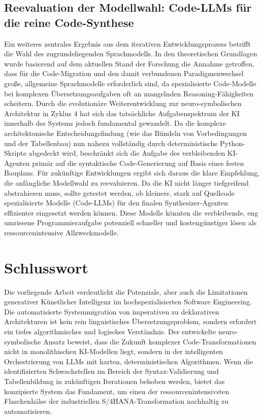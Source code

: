 \subsection{Reevaluation der Modellwahl: Code-LLMs für die reine Code-Synthese}
Ein weiteres zentrales Ergebnis aus dem iterativen Entwicklungsprozess betrifft die Wahl des zugrundeliegenden Sprachmodells. In den theoretischen Grundlagen wurde basierend auf dem aktuellen Stand der Forschung die Annahme getroffen, dass für die Code-Migration und den damit verbundenen Paradigmenwechsel große, allgemeine Sprachmodelle erforderlich sind, da spezialisierte Code-Modelle bei komplexen Übersetzungsaufgaben oft an mangelnden Reasoning-Fähigkeiten scheitern. Durch die evolutionäre Weiterentwicklung zur neuro-symbolischen Architektur in Zyklus 4 hat sich das tatsächliche Aufgabenspektrum der \ac{KI} innerhalb des Systems jedoch fundamental gewandelt. Da die komplexe architektonische Entscheidungsfindung (wie das Bündeln von Vorbedingungen und der Tabellenbau) nun nahezu vollständig durch deterministische Python-Skripte abgedeckt wird, beschränkt sich die Aufgabe des verbleibenden \ac{KI}-Agenten primär auf die syntaktische Code-Generierung auf Basis eines festen Bauplans. Für zukünftige Entwicklungen ergibt sich daraus die klare Empfehlung, die anfängliche Modellwahl zu reevaluieren. Da die \ac{KI} nicht länger tiefgreifend abstrahieren muss, sollte getestet werden, ob kleinere, stark auf Quellcode spezialisierte Modelle (Code-LLMs) für den finalen Synthesizer-Agenten effizienter eingesetzt werden können. Diese Modelle könnten die verbleibende, eng umrissene Programmieraufgabe potenziell schneller und kostengünstiger lösen als ressourcenintensive Allzweckmodelle.

\section{Schlusswort}
Die vorliegende Arbeit verdeutlicht die Potenziale, aber auch die Limitationen generativer Künstlicher Intelligenz im hochspezialisierten Software Engineering. Die automatisierte Systemmigration von imperativen zu deklarativen Architekturen ist kein rein linguistisches Übersetzungsproblem, sondern erfordert ein tiefes algorithmisches und logisches Verständnis. Der entwickelte neuro-symbolische Ansatz beweist, dass die Zukunft komplexer Code-Transformationen nicht in monolithischen KI-Modellen liegt, sondern in der intelligenten Orchestrierung von \ac{LLMs} mit harten, deterministischen Algorithmen. Wenn die identifizierten Schwachstellen im Bereich der Syntax-Validierung und Tabellenbildung in zukünftigen Iterationen behoben werden, bietet das konzipierte System das Fundament, um einen der ressourcenintensivsten Flaschenhälse der industriellen S/4HANA-Transformation nachhaltig zu automatisieren.